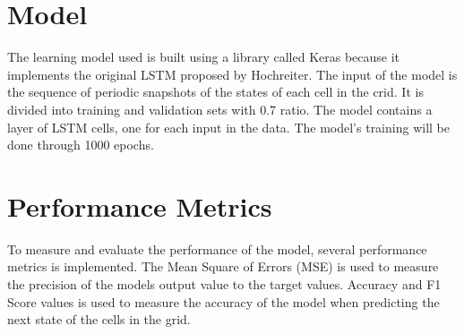 \section{Model}
    The learning model used is built using a library called Keras because it implements the original LSTM proposed by Hochreiter. The input of the model is the sequence of periodic snapshots of the states of each cell in the crid. It is divided into training and validation sets with 0.7 ratio. The model contains a layer of LSTM cells, one for each input in the data. The model's training will be done through 1000 epochs.

\section{Performance Metrics}
    To measure and evaluate the performance of the model, several performance metrics is implemented. The Mean Square of Errors (MSE) is used to measure the precision of the models output value to the target values. Accuracy and F1 Score values is used to measure the accuracy of the model when predicting the next state of the cells in the grid.
